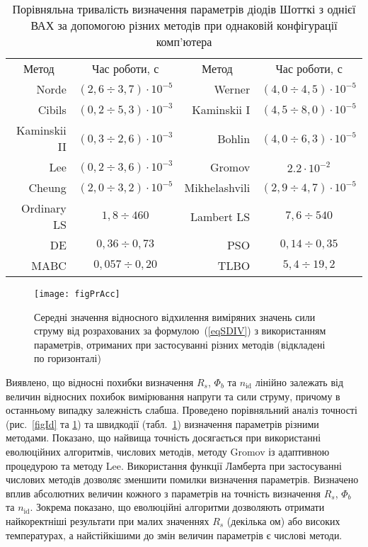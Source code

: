 \begin{table}
\caption{\label{tabRT}Порівняльна тривалість визначення параметрів діодів Шотткі з однієї ВАХ за допомогою різних методів при однаковій конфігурації комп'ютера}
\centering
\begin{tabular}{|r|c|r|c|}
\hline
\multicolumn{1}{|c|}{Метод}&Час роботи, с &\multicolumn{1}{c|}{Метод}&Час роботи, с\\ \hhline{|====|}
Norde &$(2,6\div3,7)\cdot10^{-5}$& Werner  &$(4,0\div4,5)\cdot10^{-5}$\\ \hline
Cibils  &$(0,2\div5,3)\cdot10^{-3}$& Kaminskii I &$(4,5\div8,0)\cdot10^{-5}$\\ \hline
Kaminskii II &$(0,3\div2,6)\cdot10^{-3}$& Bohlin &$(4,0\div6,3)\cdot10^{-5}$\\ \hline
Lee &$(0,2\div3,6)\cdot10^{-3}$& Gromov &$2.2\cdot10^{-2}$\\ \hline
Cheung &$(2,0\div3,2)\cdot10^{-5}$&Mikhelashvili &$(2,9\div4,7)\cdot10^{-5}$\\ \hline
Ordinary LS &$1,8\div460$&Lambert LS &$7,6\div540$\\ \hline
DE &$0,36\div0,73$&PSO &$0,14\div0,35$\\ \hline
MABC &$0,057\div0,20$&TLBO &$5,4\div19,2$ \\
\hline
\end{tabular}
\end{table}

\begin{figure}[b]
\center
\texttt{[image: figPrAcc]}%
\caption{\label{figPrAcc}
Середні значення відносного відхилення виміряних значень сили струму
від розрахованих за формулою~(\ref{eqSDIV}) з використанням параметрів, отриманих при застосуванні різних методів (відкладені по горизонталі)
}
\end{figure}
Виявлено, що
відносні похибки визначення $R_s$, $\Phi_b$ та $n_\mathrm{id}$ лінійно залежать від величин відносних
похибок вимірювання напруги та сили струму, причому в останньому випадку залежність слабша.
Проведено порівняльний аналіз точності (рис.~\ref{figId} та \ref{figPrAcc}) та швидкодії (табл.~\ref{tabRT}) визначення
параметрів різними методами.
Показано, що найвища точність досягається при використанні еволюцiйних алгоритмів, числових методів,
методу Gromov із адаптивною процедурою та методу Lee.
Використання функції Ламберта при застосуванні числових методів дозволяє зменшити помилки визначення параметрів.
Визначено вплив абсолютних величин кожного з параметрів на точність визначення $R_s$, $\Phi_b$ та $n_\mathrm{id}$.
Зокрема показано, що еволюційні алгоритми дозволяють отримати найкоректніші результати при малих
значеннях $R_s$ (декілька ом) або високих температурах, а найстійкішими до змін величин параметрів є числові методи.







